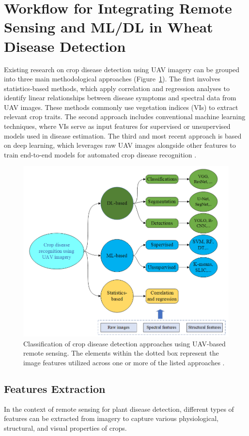 \section{Workflow for Integrating Remote Sensing and ML/DL in Wheat Disease Detection}
Existing research on crop disease detection using UAV imagery can be grouped into three main methodological approaches (Figure~\ref{fig:Classificationapproaches}). The first involves statistics-based methods, which apply correlation and regression analyses to identify linear relationships between disease symptoms and spectral data from UAV images. These methods commonly use vegetation indices (VIs) to extract relevant crop traits. The second approach includes conventional machine learning techniques, where VIs serve as input features for supervised or unsupervised models used in disease estimation. The third and most recent approach is based on deep learning, which leverages raw UAV images alongside other features to train end-to-end models for automated crop disease recognition \parencite{shahi2023recent}.


\begin{figure}[H]
    \centering
    \includegraphics[width=0.8
    \textwidth]{chapters/chapter3/images/Figure07.png}
    \caption{Classification of crop disease detection approaches using UAV-based remote sensing. The elements within the dotted box represent the image features utilized across one or more of the listed approaches \parencite{shahi2023recent}.}
    \label{fig:Classificationapproaches}
\end{figure}

\subsection{Features Extraction}
In the context of remote sensing for plant disease detection, different types of features can be extracted from imagery to capture various physiological, structural, and visual properties of crops.


